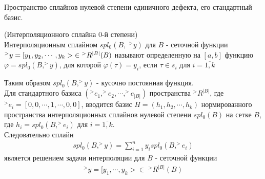 \documentclass[__main__.tex]{subfiles}
\begin{document}
	Пространство сплайнов нулевой степени единичного дефекта, его стандартный базис.
	\begin{definition}
		(Интерполяционного сплайна 0-й степени)\\
		Интерполяционным сплайном $spl_0\left(B,\;^>y\right)$ для $B$ - сеточной функции $^{>}y = [y_1,y_2,\cdots, y_k>\; \in \\ ^{>}R^{|B|}(B)$ называют определенную на $[a,b]$ функцию $\varphi = spl_0\left(B,^{>}y\right)$, для которой $\varphi(\tau) = y_i$, если $\tau \in s_i$ для $i = \overline{1,k}$ 
	\end{definition}
	Таким образом $spl_0\left(B,^>y\right)$ - кусочно постоянная функция.\\ Для стандартного базиса $(^>e_1,^>e_2,\cdots,^>e_{|B|})$ пространства $^>R^{|B|}$, где $^>e_i = [0,0,\cdots,1,\cdots,0,0]$, вводится базис $H = (h_1,h_2,\cdots, h_k)$ нормированного пространства интерполяционных сплайнов нулевой степени $spl_0(B)$ на сетке $B$, где $h_i = spl_0\left(B,^>e_i\right)$ для $i=\overline{1,k}$.\\
	Следовательно сплайн
	\begin{gather*}
		spl_0\left(B,^>y\right) = \sum_{i=1}^{n}y_i spl_0\left(B,^>e_i\right)
	\end{gather*}
	является решением задачи интерполяции для $B$ - сеточной функции
	\begin{gather*}
		^>y = [y_1,\cdots,y_k> \in\;^>R^{|B|}(B)
	\end{gather*}
\end{document}
